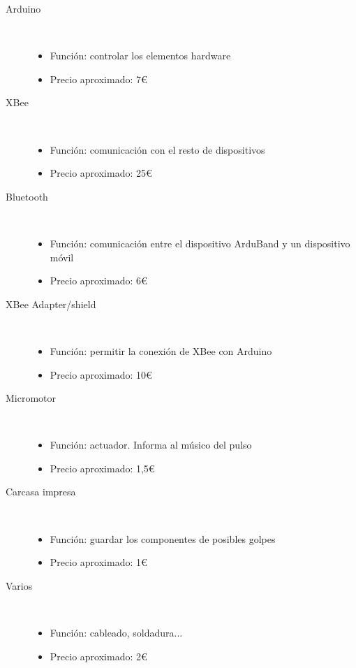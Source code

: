   \begin{description}
    \item [Arduino]\hfill \\
      \begin{itemize}
        \item {Función: controlar los elementos hardware}
        \item {Precio aproximado: 7\euro}
      \end{itemize}
    \item [XBee]\hfill \\
      \begin{itemize}
        \item {Función: comunicación con el resto de dispositivos}
        \item {Precio aproximado: 25\euro}
      \end{itemize}
      \item [Bluetooth]\hfill \\
        \begin{itemize}
          \item {Función: comunicación entre el dispositivo ArduBand y un dispositivo móvil}
          \item {Precio aproximado: 6\euro}
        \end{itemize}
      \item [XBee Adapter/shield]\hfill \\
        \begin{itemize}
          \item {Función: permitir la conexión de XBee con Arduino}
          \item {Precio aproximado: 10\euro}
        \end{itemize}
      \item [Micromotor]\hfill \\
        \begin{itemize}
          \item {Función: actuador. Informa al músico del pulso}
          \item {Precio aproximado: 1,5\euro}
        \end{itemize}
      \item [Carcasa impresa]\hfill \\
          \begin{itemize}
            \item {Función: guardar los componentes de posibles golpes}
            \item {Precio aproximado: 1\euro}
        \end{itemize}
      \item [Varios]\hfill \\
        \begin{itemize}
          \item {Función: cableado, soldadura...}
          \item {Precio aproximado: 2\euro}
        \end{itemize}
  \end{description}

